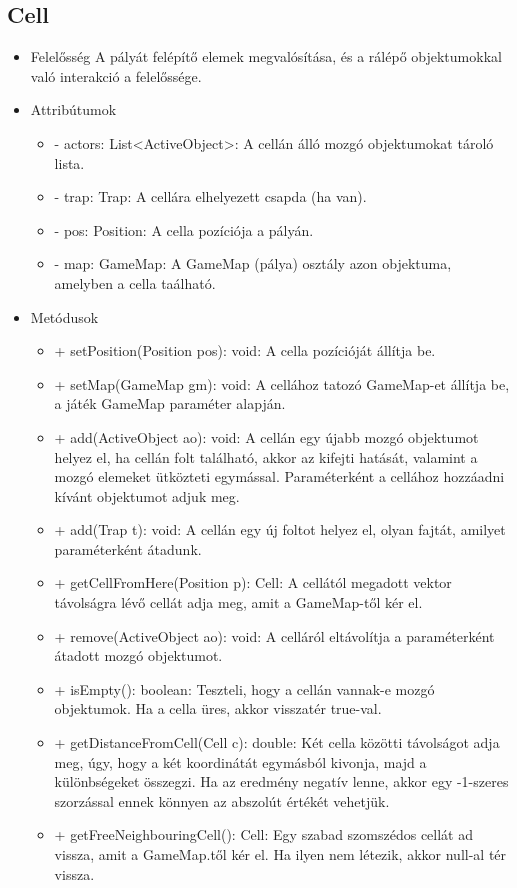 \subsection{Cell}
\begin{itemize}
	\item Felelősség\newline
	A pályát felépítő elemek megvalósítása, és a rálépő objektumokkal való interakció a felelőssége.

	\item Attribútumok
		
	\begin{itemize}
		\item - actors: List<ActiveObject>: A cellán álló mozgó objektumokat tároló lista.
		\item - trap: Trap: A cellára elhelyezett csapda (ha van).
		\item - pos: Position: A cella pozíciója a pályán.
		\item - map: GameMap: A GameMap (pálya) osztály azon objektuma, amelyben a cella taálható.
	\end{itemize}
	\item Metódusok

	\begin{itemize}
		\item + setPosition(Position pos): void: A cella pozícióját állítja be.
		\item + setMap(GameMap gm): void: A cellához tatozó GameMap-et állítja be, a játék GameMap paraméter alapján.
		\item + add(ActiveObject ao): void: A cellán egy újabb mozgó objektumot helyez el, ha cellán folt található, akkor az kifejti hatását, valamint a mozgó elemeket ütközteti egymással. Paraméterként a cellához hozzáadni kívánt objektumot adjuk meg.
		\item + add(Trap t): void: A cellán egy új foltot helyez el, olyan fajtát, amilyet paraméterként átadunk.
		\item + getCellFromHere(Position p): Cell: A cellától megadott vektor távolságra lévő cellát adja meg, amit a GameMap-től kér el. 
		\item + remove(ActiveObject ao): void: A celláról eltávolítja a paraméterként átadott mozgó objektumot.
		\item + isEmpty(): boolean: Teszteli, hogy a cellán vannak-e mozgó objektumok. Ha a cella üres, akkor visszatér true-val. 
		\item + getDistanceFromCell(Cell c): double: Két cella közötti távolságot adja meg, úgy, hogy a két koordinátát egymásból kivonja, majd a különbségeket összegzi. Ha az eredmény negatív lenne, akkor egy -1-szeres szorzással ennek könnyen az abszolút értékét vehetjük.
		\item + getFreeNeighbouringCell(): Cell: Egy szabad szomszédos cellát ad vissza, amit a GameMap.től kér el. Ha ilyen nem létezik, akkor null-al tér vissza.
		
	\end{itemize}
\end{itemize}



